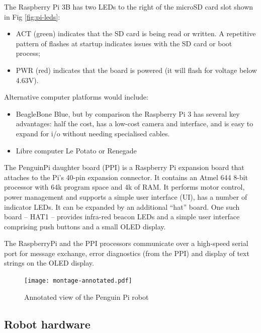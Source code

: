 \documentclass[11pt,fleqn]{article}
\begin{document}
The Raspberry Pi 3B has two LEDs to the right of the microSD card slot shown in Fig \ref{fig:pi-leds}:
\begin{itemize}
\item ACT (green) indicates that the SD card is being read or written.  A repetitive pattern of flashes at startup indicates issues
with the SD card or boot process;
\item PWR (red) indicates that the board is powered (it will flash for voltage below 4.63\unit{V}).
\end{itemize}

Alternative computer platforms would include:
\begin{itemize}
\item  BeagleBone Blue, but by comparison  the Raspberry Pi 3 has several key advantages:
 half the cost, has a low-cost camera and interface, and is easy to expand for i/o without needing specialised cables.
\item  Libre computer Le Potato or Renegade
\end{itemize}

The PenguinPi daughter board (PPI) is a Raspberry Pi expansion board that attaches to the Pi's 40-pin expansion connector.
It contains an Atmel 644 8-bit processor with 64k program space and 4k of RAM.  It performs motor control, power management and supports a simple user interface (UI), has a number of indicator LEDs.
It can be expanded by an additional ``hat'' board.
One such board -- HAT1 -- provides infra-red beacon LEDs and a simple user interface comprising push buttons and a small OLED display.

The RaspberryPi and the PPI processors communicate over a high-speed serial port for message exchange, error diagnostics (from the PPI) and display of text strings on the OLED display.

\begin{figure}
\centering
\texttt{[image: montage-annotated.pdf]}
\caption{Annotated view of the Penguin Pi robot}\label{fig:robot-annotated}
\end{figure}

\subsection{Robot hardware}
\end{document}
